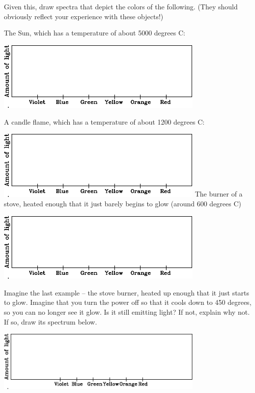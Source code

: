 \documentclass[11pt]{article}
\begin{document}
Given this, draw spectra that depict the colors of the following. (They should obviously reflect your experience with these objects!)

\begin{center}

\large

The Sun, which has a temperature of about 5000 degrees C:

\includegraphics[width=4in]{blank-spectrum-crop.pdf}

\bigskip

A candle flame, which has a temperature of about 1200 degrees C:

\includegraphics[width=4in]{blank-spectrum-crop.pdf}
\bigskip
\newpage
The burner of a stove, heated enough that it just barely begins to glow (around 600 degrees C)

\includegraphics[width=4in]{blank-spectrum-crop.pdf}
\bigskip

\end{center}

Imagine the last example -- the stove burner, heated up enough that it just starts to glow. Imagine that you turn the power off so that it cools down to
450 degrees, so you can no longer see it glow. Is it still emitting light? If not, explain why not. If so, draw its spectrum below.

\begin{center}

\includegraphics[width=4in]{broad-spectrum-crop.pdf}

\end{center}
\end{document}
